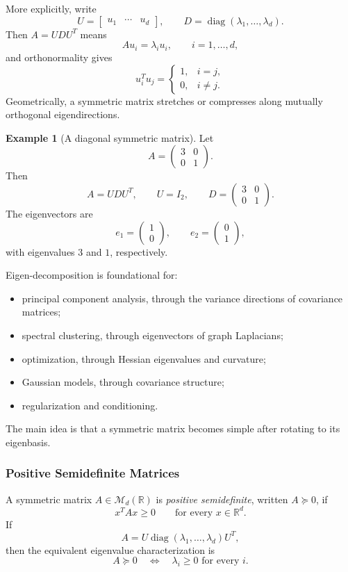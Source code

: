 \documentclass[12pt,oneside]{book}
\numberwithin{equation}{section}
\theoremstyle{definition}
\newtheorem{example}{Example}[section]
\theoremstyle{plain}
\theoremstyle{remark}
\newcommand{\R}{\mathbb{R}}
\newcommand{\diag}{\operatorname{diag}}
\begin{document}
More explicitly, write
\[
U=\begin{bmatrix}u_1&\cdots&u_d\end{bmatrix},
\qquad
D=\diag(\lambda_1,\ldots,\lambda_d).
\]
Then $A=UDU^T$ means
\[
Au_i=\lambda_i u_i,
\qquad i=1,\ldots,d,
\]
and orthonormality gives
\[
u_i^Tu_j=
\begin{cases}
1, & i=j,\\
0, & i\neq j.
\end{cases}
\]
Geometrically, a symmetric matrix stretches or compresses along mutually orthogonal eigendirections.

\begin{example}[A diagonal symmetric matrix]
Let
\[
A=
\begin{pmatrix}
3&0\\
0&1
\end{pmatrix}.
\]
Then
\[
A=UDU^T,
\qquad
U=I_2,
\qquad
D=
\begin{pmatrix}
3&0\\
0&1
\end{pmatrix}.
\]
The eigenvectors are
\[
e_1=\begin{pmatrix}1\\0\end{pmatrix},
\qquad
e_2=\begin{pmatrix}0\\1\end{pmatrix},
\]
with eigenvalues $3$ and $1$, respectively.
\end{example}

Eigen-decomposition is foundational for:
\begin{itemize}
    \item principal component analysis, through the variance directions of covariance matrices;
    \item spectral clustering, through eigenvectors of graph Laplacians;
    \item optimization, through Hessian eigenvalues and curvature;
    \item Gaussian models, through covariance structure;
    \item regularization and conditioning.
\end{itemize}
The main idea is that a symmetric matrix becomes simple after rotating to its eigenbasis.

\subsubsection{Positive Semidefinite Matrices}
A symmetric matrix $A\in\mathcal{M}_d(\R)$ is \emph{positive semidefinite}, written $A\succeq0$, if
\[
x^TAx\geq0
\qquad\text{for every }x\in\R^d.
\]
If
\[
A=U\diag(\lambda_1,\ldots,\lambda_d)U^T,
\]
then the equivalent eigenvalue characterization is
\[
A\succeq0
\quad\Longleftrightarrow\quad
\lambda_i\geq0\text{ for every }i.
\]
\end{document}
